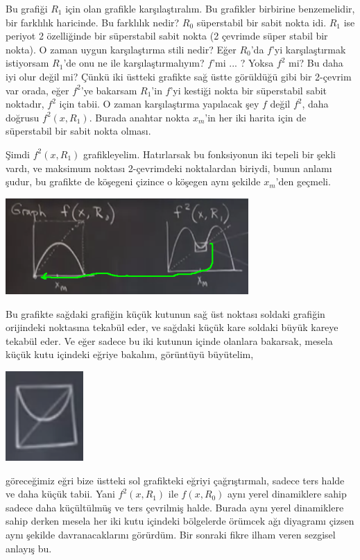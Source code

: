 \documentclass[12pt,fleqn]{article}\usepackage{../../common}
\begin{document}
Bu grafiği $R_1$ için olan grafikle karşılaştıralım. Bu grafikler birbirine
benzemelidir, bir farklılık haricinde. Bu farklılık nedir? $R_0$ süperstabil bir
sabit nokta idi. $R_1$ ise periyot 2 özelliğinde bir süperstabil sabit nokta (2
çevrimde süper stabil bir nokta). O zaman uygun karşılaştırma stili nedir? Eğer
$R_0$'da $f$'yi karşılaştırmak istiyorsam $R_1$'de onu ne ile
karşılaştırmalıyım? $f$'mi ... ? Yoksa $f^2$ mi? Bu daha iyi olur değil mi?
Çünkü iki üstteki grafikte sağ üstte görüldüğü gibi bir 2-çevrim var orada, eğer
$f^2$'ye bakarsam $R_1$'in $f$'yi kestiği nokta bir süperstabil sabit noktadır,
$f^2$ için tabii. O zaman karşılaştırma yapılacak şey $f$ değil $f^2$, daha
doğrusu $f^2(x,R_1)$. Burada anahtar nokta $x_m$'in her iki harita için de
süperstabil bir sabit nokta olması.

Şimdi $f^2(x,R_1)$ grafikleyelim. Hatırlarsak bu fonksiyonun iki tepeli bir
şekli vardı, ve maksimum noktası 2-çevrimdeki noktalardan biriydi, bunun anlamı
şudur, bu grafikte de köşegeni çizince o köşegen aynı şekilde $x_m$'den
geçmeli. 

\includegraphics[width=25em]{21_05.png}

Bu grafikte sağdaki grafiğin küçük kutunun sağ üst noktası soldaki grafiğin
orijindeki noktasına tekabül eder, ve sağdaki küçük kare soldaki büyük kareye
tekabül eder. Ve eğer sadece bu iki kutunun içinde olanlara bakarsak, mesela
küçük kutu içindeki eğriye bakalım, görüntüyü büyütelim,

\includegraphics[width=8em]{21_06.png}

göreceğimiz eğri bize üstteki sol grafikteki eğriyi çağrıştırmalı, sadece ters
halde ve daha küçük tabii. Yani $f^2(x,R_1)$ ile $f(x,R_0)$ aynı yerel
dinamiklere sahip sadece daha küçültülmüş ve ters çevrilmiş halde. Burada aynı
yerel dinamiklere sahip derken mesela her iki kutu içindeki bölgelerde örümcek
ağı diyagramı çizsen aynı şekilde davranacaklarını görürdüm. Bir sonraki fikre
ilham veren sezgisel anlayış bu.
\end{document}
